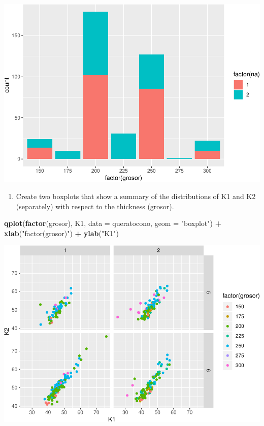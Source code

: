\documentclass[
]{article}
\newenvironment{Shaded}{\begin{snugshade}}{\end{snugshade}}
\newcommand{\DataTypeTok}[1]{\textcolor[rgb]{0.13,0.29,0.53}{#1}}
\newcommand{\KeywordTok}[1]{\textcolor[rgb]{0.13,0.29,0.53}{\textbf{#1}}}
\newcommand{\NormalTok}[1]{#1}
\newcommand{\OperatorTok}[1]{\textcolor[rgb]{0.81,0.36,0.00}{\textbf{#1}}}
\newcommand{\StringTok}[1]{\textcolor[rgb]{0.31,0.60,0.02}{#1}}
\providecommand{\tightlist}{%
  \setlength{\itemsep}{0pt}\setlength{\parskip}{0pt}}
\begin{document}
\includegraphics{document_files/figure-latex/unnamed-chunk-6-1.pdf}

\begin{enumerate}
\def\labelenumi{\arabic{enumi}.}
\setcounter{enumi}{5}
\tightlist
\item
  Create two boxplots that show a summary of the distributions of K1 and
  K2 (separately) with respect to the thickness (grosor).
\end{enumerate}

\begin{Shaded}
\begin{Highlighting}[]
\KeywordTok{qplot}\NormalTok{(}\KeywordTok{factor}\NormalTok{(grosor), K1, }\DataTypeTok{data =}\NormalTok{ queratocono, }\DataTypeTok{geom =} \StringTok{"boxplot"}\NormalTok{) }\OperatorTok{+}
\StringTok{  }\KeywordTok{xlab}\NormalTok{(}\StringTok{"factor(grosor)"}\NormalTok{) }\OperatorTok{+}\StringTok{ }\KeywordTok{ylab}\NormalTok{(}\StringTok{"K1"}\NormalTok{)}
\end{Highlighting}
\end{Shaded}

\includegraphics{document_files/figure-latex/unnamed-chunk-7-1.pdf}
\end{document}
